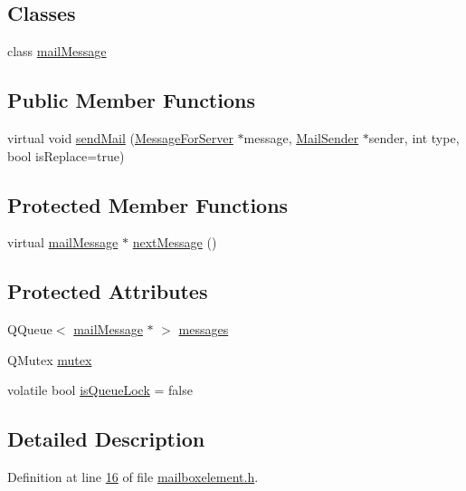 \subsection*{Classes}
\begin{DoxyCompactItemize}
\item 
class \hyperlink{a00201}{mail\+Message}
\end{DoxyCompactItemize}
\subsection*{Public Member Functions}
\begin{DoxyCompactItemize}
\item 
virtual void \hyperlink{a00197_a0efada2a49e9a841430a8b6f71b6803d}{send\+Mail} (\hyperlink{a00121}{Message\+For\+Server} $\ast$message, \hyperlink{a00205}{Mail\+Sender} $\ast$sender, int type, bool is\+Replace=true)
\end{DoxyCompactItemize}
\subsection*{Protected Member Functions}
\begin{DoxyCompactItemize}
\item 
virtual \hyperlink{a00201}{mail\+Message} $\ast$ \hyperlink{a00197_a127a70ec582190f90979cb72b8cba72c}{next\+Message} ()
\end{DoxyCompactItemize}
\subsection*{Protected Attributes}
\begin{DoxyCompactItemize}
\item 
Q\+Queue$<$ \hyperlink{a00201}{mail\+Message} $\ast$ $>$ \hyperlink{a00197_ace6950e3788bb037f23ce8668ef83829}{messages}
\item 
Q\+Mutex \hyperlink{a00197_a116d4905d302bdb69c00b54b621dd827}{mutex}
\item 
volatile bool \hyperlink{a00197_a33c370cb3c6292cd800008a67002a67f}{is\+Queue\+Lock} = false
\end{DoxyCompactItemize}


\subsection{Detailed Description}


Definition at line \hyperlink{a00002_source_l00016}{16} of file \hyperlink{a00002_source}{mailboxelement.\+h}.




